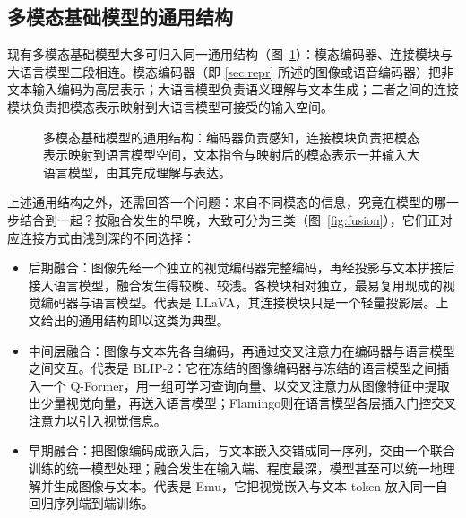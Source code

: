 \subsection{多模态基础模型的通用结构}
\label{sub:arch}

现有多模态基础模型大多可归入同一通用结构（图~\ref{fig:pipeline}）：模态编码器、连接模块与大语言模型三段相连。模态编码器（即 \ref{sec:repr} 所述的图像或语音编码器）把非文本输入编码为高层表示；大语言模型负责语义理解与文本生成；二者之间的连接模块负责把模态表示映射到大语言模型可接受的输入空间。

\begin{figure}[htbp]
  \centering
  \caption{多模态基础模型的通用结构：编码器负责感知，连接模块负责把模态表示映射到语言模型空间，文本指令与映射后的模态表示一并输入大语言模型，由其完成理解与表达。}
  \label{fig:pipeline}
\end{figure}

上述通用结构之外，还需回答一个问题：来自不同模态的信息，究竟在模型的哪一步结合到一起？按融合发生的早晚，大致可分为三类（图~\ref{fig:fusion}），它们正对应连接方式由浅到深的不同选择：

\begin{itemize}
  \item 后期融合：图像先经一个独立的视觉编码器完整编码，再经投影与文本拼接后接入语言模型，融合发生得较晚、较浅。各模块相对独立，最易复用现成的视觉编码器与语言模型。代表是 LLaVA\cite{llava}，其连接模块只是一个轻量投影层。上文给出的通用结构即以这类为典型。
  \item 中间层融合：图像与文本先各自编码，再通过交叉注意力在编码器与语言模型之间交互。代表是 BLIP-2\cite{blip2}：它在冻结的图像编码器与冻结的语言模型之间插入一个 Q-Former，用一组可学习查询向量、以交叉注意力从图像特征中提取出少量视觉向量，再送入语言模型；Flamingo\cite{flamingo}则在语言模型各层插入门控交叉注意力以引入视觉信息。
  \item 早期融合：把图像编码成嵌入后，与文本嵌入交错成同一序列，交由一个联合训练的统一模型处理；融合发生在输入端、程度最深，模型甚至可以统一地理解并生成图像与文本。代表是 Emu\cite{emu}，它把视觉嵌入与文本 token 放入同一自回归序列端到端训练。
\end{itemize}


